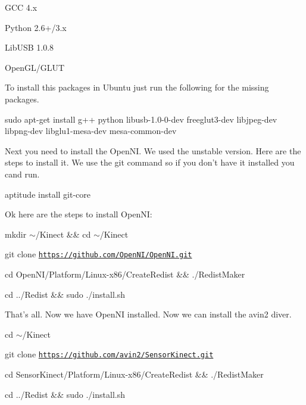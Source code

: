 \begin{DoxyItemize}
\item GCC 4.x
\item Python 2.6+/3.x
\item LibUSB 1.0.8
\item OpenGL/GLUT
\end{DoxyItemize}

To install this packages in Ubuntu just run the following for the missing packages.


\begin{DoxyItemize}
\item sudo apt-\/get install g++ python libusb-\/1.0-\/0-\/dev freeglut3-\/dev libjpeg-\/dev libpng-\/dev libglu1-\/mesa-\/dev mesa-\/common-\/dev
\end{DoxyItemize}

Next you need to install the OpenNI. We used the unstable version. Here are the steps to install it. We use the git command so if you don't have it installed you cand run.


\begin{DoxyEnumerate}
\item aptitude install git-\/core
\end{DoxyEnumerate}

Ok here are the steps to install OpenNI:


\begin{DoxyEnumerate}
\item mkdir $\sim$/Kinect \&\& cd $\sim$/Kinect
\item git clone \href{https://github.com/OpenNI/OpenNI.git}{\tt https://github.com/OpenNI/OpenNI.git}
\item cd OpenNI/Platform/Linux-\/x86/CreateRedist \&\& ./RedistMaker
\item cd ../Redist \&\& sudo ./install.sh
\end{DoxyEnumerate}

That's all. Now we have OpenNI installed. Now we can install the avin2 diver.


\begin{DoxyEnumerate}
\item cd $\sim$/Kinect
\item git clone \href{https://github.com/avin2/SensorKinect.git}{\tt https://github.com/avin2/SensorKinect.git}
\item cd SensorKinect/Platform/Linux-\/x86/CreateRedist \&\& ./RedistMaker
\item cd ../Redist \&\& sudo ./install.sh
\end{DoxyEnumerate}

